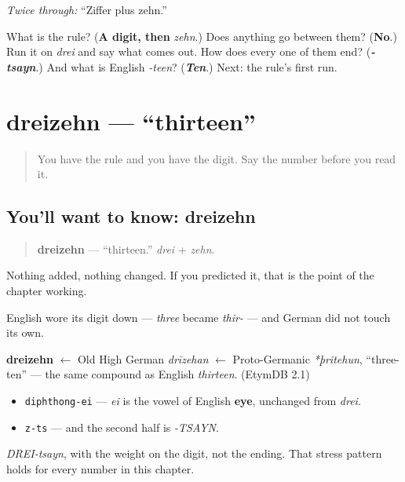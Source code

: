 \emph{Twice through:} \textquotedblleft{}Ziffer plus zehn.\textquotedblright{}

\begin{tcolorbox}[breakable,colback=teal!4,colframe=teal!35!black,title={Before you move on}]
What is the rule? (\textbf{A digit, then} \emph{zehn}.) Does anything go between them? (\textbf{No}.) Run it on \emph{drei} and say what comes out. How does every one of them end? (\emph{\textbf{-tsayn}}.) And what is English \emph{-teen}? (\emph{\textbf{Ten}}.) Next: the rule's first run.
\end{tcolorbox}
\section[dreizehn]{dreizehn — \textquotedblleft{}thirteen\textquotedblright{}}

\label{lesson:GE-C12-dreizehn}



\begin{quote}
You have the rule and you have the digit. Say the number before you read it.
\end{quote}

\subsection*{You'll want to know: dreizehn}
\begin{quote}
\textbf{dreizehn} — \textquotedblleft{}thirteen.\textquotedblright{} \emph{drei} + \emph{zehn}.
\end{quote}

Nothing added, nothing changed. If you predicted it, that is the point of the chapter working.

English wore its digit down — \emph{three} became \emph{thir-} — and German did not touch its own.

\begin{cousinweb}
\textbf{dreizehn} $\leftarrow$ Old High German \emph{drīzehan} $\leftarrow$ Proto-Germanic \emph{*þritehun}, \textquotedblleft{}three-ten\textquotedblright{} — the same compound as English \emph{thirteen}. (EtymDB 2.1)
\end{cousinweb}

\begin{sounds}
\begin{itemize}
\raggedright
  \item \texttt{diphthong-ei} — \emph{ei} is the vowel of English \textbf{eye}, unchanged from \emph{drei}.
  \item \texttt{z-ts} — and the second half is \emph{-TSAYN}.
\end{itemize}

\emph{DREI-tsayn}, with the weight on the digit, not the ending. That stress pattern holds for every number in this chapter.
\end{sounds}

